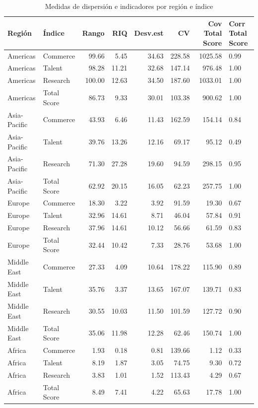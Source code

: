 \documentclass[
]{article}
\begin{document}
\renewcommand{\arraystretch}{1.3}
\begin{scriptsize}
\begin{longtable}[t]{llrrrrrl}
\caption{\label{tab:tabla4}Medidas de dispersión e indicadores por región e índice}\\
\toprule
Región & Índice & Rango & RIQ & Desv.est & CV & Cov Total Score & Corr Total Score\\
\midrule
Americas & Commerce & 99.66 & 5.45 & 34.63 & 228.58 & 1025.58 & 0.99\\
Americas & Talent & 98.28 & 11.21 & 32.68 & 147.14 & 976.48 & 1.00\\
Americas & Research & 100.00 & 12.63 & 34.50 & 187.60 & 1033.01 & 1.00\\
Americas & Total Score & 86.73 & 9.33 & 30.01 & 103.38 & 900.62 & 1.00\\
Asia-Pacific & Commerce & 43.93 & 6.46 & 11.43 & 162.59 & 154.14 & 0.84\\
\addlinespace
Asia-Pacific & Talent & 39.76 & 13.26 & 12.16 & 69.17 & 95.12 & 0.49\\
Asia-Pacific & Research & 71.30 & 27.28 & 19.60 & 94.59 & 298.15 & 0.95\\
Asia-Pacific & Total Score & 62.92 & 20.15 & 16.05 & 62.23 & 257.75 & 1.00\\
Europe & Commerce & 18.30 & 3.22 & 3.92 & 91.59 & 19.30 & 0.67\\
Europe & Talent & 32.96 & 14.61 & 8.71 & 46.04 & 57.84 & 0.91\\
\addlinespace
Europe & Research & 37.96 & 14.61 & 10.12 & 56.66 & 61.59 & 0.83\\
Europe & Total Score & 32.44 & 10.42 & 7.33 & 28.76 & 53.68 & 1.00\\
Middle East & Commerce & 27.33 & 4.09 & 10.64 & 178.22 & 115.90 & 0.89\\
Middle East & Talent & 35.76 & 3.37 & 13.65 & 167.07 & 139.71 & 0.83\\
Middle East & Research & 30.55 & 10.03 & 11.50 & 101.59 & 127.72 & 0.90\\
\addlinespace
Middle East & Total Score & 35.06 & 11.98 & 12.28 & 62.46 & 150.74 & 1.00\\
Africa & Commerce & 1.93 & 0.18 & 0.81 & 139.66 & 1.12 & 0.33\\
Africa & Talent & 8.19 & 1.87 & 3.05 & 74.75 & 9.30 & 0.72\\
Africa & Research & 3.83 & 1.01 & 1.52 & 113.43 & 4.29 & 0.67\\
Africa & Total Score & 8.49 & 7.41 & 4.22 & 65.63 & 17.78 & 1.00\\
\bottomrule
\end{longtable}

\end{scriptsize}\renewcommand{\arraystretch}{1}
\end{document}
